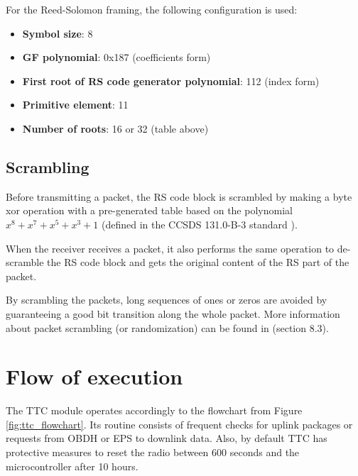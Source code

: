 For the Reed-Solomon framing, the following configuration is used:

\begin{itemize}
    \item \textbf{Symbol size}: 8
    \item \textbf{GF polynomial}: 0x187 (coefficients form)
    \item \textbf{First root of RS code generator polynomial}: 112 (index form)
    \item \textbf{Primitive element}: 11
    \item \textbf{Number of roots}: 16 or 32 (table above)
\end{itemize}

\subsection{Scrambling}

Before transmitting a packet, the RS code block is scrambled by making a byte xor operation with a pre-generated table based on the polynomial $x^{8} + x^{7} + x^{5} + x^{3} + 1$ (defined in the CCSDS 131.0-B-3 standard \cite{ccsds}).

When the receiver receives a packet, it also performs the same operation to de-scramble the RS code block and gets the original content of the RS part of the packet.

By scrambling the packets, long sequences of ones or zeros are avoided by guaranteeing a good bit transition along the whole packet. More information about packet scrambling (or randomization) can be found in \cite{ccsds} (section 8.3).

\section{Flow of execution}
The TTC module operates accordingly to the flowchart from Figure \ref{fig:ttc_flowchart}. Its routine consists of frequent checks for uplink packages or requests from OBDH or EPS to downlink data. Also, by default TTC has protective measures to reset the radio between 600 seconds and the microcontroller after 10 hours.

